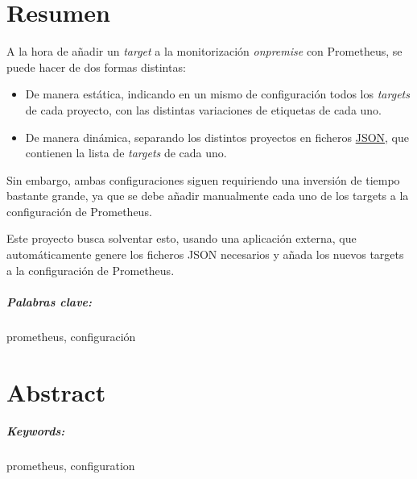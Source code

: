 \chapter*{Resumen}

A la hora de añadir un \textit{target} a la monitorización \textit{onpremise} con Prometheus, se puede hacer de dos formas distintas:

\begin{itemize}
  \item De manera estática, indicando en un mismo de configuración todos los \textit{targets} de cada proyecto, con las distintas variaciones de etiquetas de cada uno.
  \item De manera dinámica, separando los distintos proyectos en ficheros \url{JSON}, que contienen la lista de \textit{targets} de cada uno.
\end{itemize}

Sin embargo, ambas configuraciones siguen requiriendo una inversión de tiempo bastante grande, ya que se debe añadir manualmente cada uno de los targets a la configuración de Prometheus.

Este proyecto busca solventar esto, usando una aplicación externa, que automáticamente genere los ficheros JSON necesarios y añada los nuevos targets a la configuración de Prometheus.

\paragraph*{Palabras clave:} prometheus, configuración


\newpage
    
\chapter*{Abstract}


\paragraph*{Keywords:} prometheus, configuration